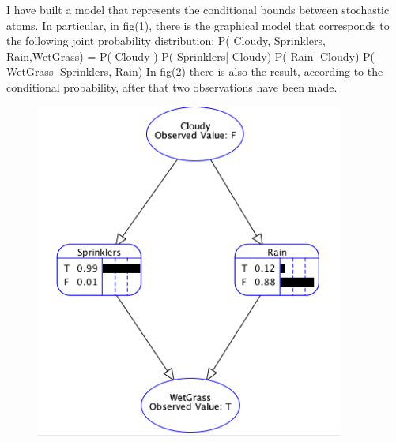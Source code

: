 \documentclass{article}
\begin{document}
I have built a model that represents the conditional bounds between stochastic atoms.
In particular, in fig(1), there is the graphical model that corresponds to the following joint probability distribution: 
\medskip
P( Cloudy, Sprinklers, Rain,WetGrass) = P( Cloudy ) P( Sprinklers| Cloudy) P( Rain| Cloudy) P( WetGrass| Sprinklers, Rain)
\smallskip
In fig(2) there is also the result, according to the conditional probability, after that two observations have been made.

\begin{center}	
\begin{figure}
\centering
\includegraphics[width=0.9\textwidth]{fig2}
\caption{}
\label{fig:2}
\end{figure}
\end{center}
\end{document}
